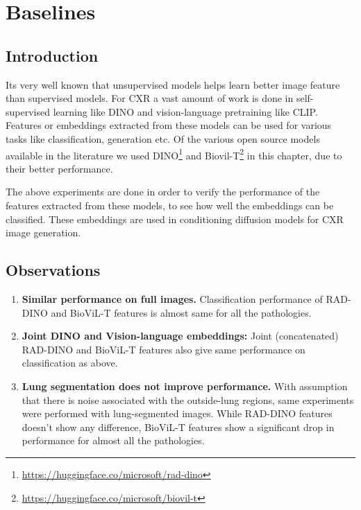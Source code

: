 \chapter{Baselines}
\label{chap:baselines}


\section{Introduction}
Its very well known that unsupervised models helps learn better image feature than supervised models. 
For CXR a vast amount of work is done in self-supervised learning like DINO and vision-language pretraining like CLIP.  
Features or embeddings extracted from these models can be used for various tasks like classification, generation etc.
Of the various open source models available in the literature we used DINO\footnote{\url{https://huggingface.co/microsoft/rad-dino}} 
 and Biovil-T\footnote{\url{https://huggingface.co/microsoft/biovil-t}} in this chapter, due to their better performance.


The above experiments are done in order to verify the performance of the features extracted from these models, to see how well the 
embeddings can be classified. These embeddings are used in conditioning diffusion models for CXR image generation.


% 

% 

\section{Observations}

\begin{enumerate}
  \item \textbf{Similar performance on full images.} Classification performance of RAD-DINO and BioViL-T features is almost same 
  for all the pathologies.

  \item \textbf{Joint DINO and Vision-language embeddings:}  Joint (concatenated) RAD-DINO and BioViL-T features also give same performance
  on classification as above. 

  \item \textbf{Lung segmentation does not improve performance.} With assumption that there is noise associated with the 
  outside-lung regions, same experiments were performed with lung-segmented images. While RAD-DINO features doesn't show
  any difference, BioViL-T features show a significant drop in performance for almost all the pathologies. 

\end{enumerate}

